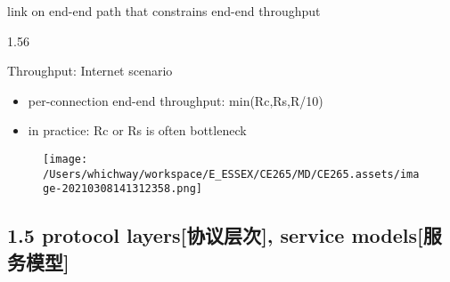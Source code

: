 \documentclass[
]{article}
\begin{document}
link on end-end path that constrains end-end throughput

1.56

Throughput: Internet scenario

\begin{itemize}
\item
  per-connection end-end throughput: min(Rc,Rs,R/10)
\item
  in practice: Rc or Rs is often bottleneck
\end{itemize}

\begin{figure}
\centering
\texttt{[image: /Users/whichway/workspace/E\_ESSEX/CE265/MD/CE265.assets/image-20210308141312358.png]}
\caption{}
\end{figure}

\hypertarget{15-protocol-layersux534fux8baeux5c42ux6b21-service-modelsux670dux52a1ux6a21ux578b}{%
\subsection{1.5 protocol layers{[}协议层次{]}, service
models{[}服务模型{]}}\label{15-protocol-layersux534fux8baeux5c42ux6b21-service-modelsux670dux52a1ux6a21ux578b}}
\end{document}
